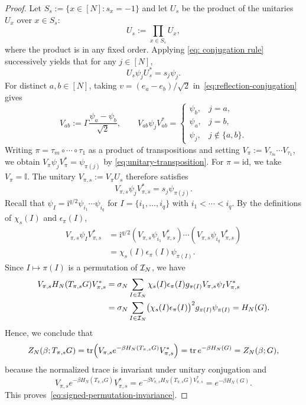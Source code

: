 \documentclass[../CLT_SYK.tex]{subfiles}
\begin{document}
\begin{proof}
Let $S_s:=\{x\in[N]:s_x=-1\}$ and let $U_s$ be the product of the unitaries
$U_x$ over $x\in S_s$:
$$U_s:= \prod_{x\in S_s} U_x,$$
where the product is in any fixed order.  Applying \eqref{eq: conjugation rule} successively yields that for any $j\in[N],$
\[
  U_s\psi_jU_s^*=s_j\psi_j.
\]
{For distinct $a,b\in[N]$, taking
$v=(e_a-e_b)/\sqrt2$ in~\eqref{eq:reflection-conjugation} gives
\begin{equation}\label{eq:unitary-transposition}
 V_{ab}:=\Gamma\frac{\psi_a-\psi_b}{\sqrt2},
\qquad
V_{ab}\psi_jV_{ab}^*
=\begin{cases}
	\psi_b,&j=a,\\
	\psi_a,&j=b,\\
	\psi_j,&j\notin\{a,b\}.
\end{cases}
\end{equation}
Writing $\pi=\tau_m\circ\cdots\circ\tau_1$ as a product of
transpositions and setting $V_\pi:=V_{\tau_m}\cdots V_{\tau_1}$,
we obtain $V_\pi\psi_jV_\pi^*=\psi_{\pi(j)}$ by \eqref{eq:unitary-transposition}.
For $\pi=\mathrm{id}$, we take $V_\pi=\mathbb I$.
The unitary $V_{\pi,s}:=V_\pi U_s$ therefore satisfies
\[
  V_{\pi,s}\psi_jV_{\pi,s}^*=s_j\psi_{\pi(j)}.
\]
Recall that $\psi_I=\mathrm i^{q/2}\psi_{i_1}\cdots\psi_{i_q}$
for $I=\{i_1,\ldots,i_q\}$ with $i_1<\cdots<i_q$.
By the definitions of $\chi_s(I)$ and $\epsilon_\pi(I)$,
\begin{align*}
  V_{\pi,s}\psi_IV_{\pi,s}^*
  &=\mathrm i^{q/2}
    (V_{\pi,s}\psi_{i_1}V_{\pi,s}^*)\cdots
    (V_{\pi,s}\psi_{i_q}V_{\pi,s}^*)\\
  &=\chi_s(I)\epsilon_\pi(I)\psi_{\pi(I)}.
\end{align*}
Since $I\mapsto\pi(I)$ is a permutation of $\mathcal I_N$, we have
\begin{align*}
  V_{\pi,s}H_N(T_{\pi,s}G)V_{\pi,s}^*
  &=\sigma_N\sum_{I\in\mathcal I_N}
    \chi_s(I)\epsilon_\pi(I)g_{\pi(I)}
    V_{\pi,s}\psi_IV_{\pi,s}^*\\
  &=\sigma_N\sum_{I\in\mathcal I_N}
    \bigl(\chi_s(I)\epsilon_\pi(I)\bigr)^2
    g_{\pi(I)}\psi_{\pi(I)}
    =H_N(G).
\end{align*}
Hence, we conclude that
\[
Z_N(\beta;T_{\pi,s}G)
=\operatorname{tr}\!\left(
V_{\pi,s}e^{-\beta H_N(T_{\pi,s}G)}V_{\pi,s}^*
\right)
=\operatorname{tr} e^{-\beta H_N(G)}
=Z_N(\beta;G),
\]
because the normalized trace is invariant under unitary conjugation
and
\[
V_{\pi,s}e^{-\beta H_N(T_{\pi,s}G)}V_{\pi,s}^*
=e^{-\beta V_{\pi,s}H_N(T_{\pi,s}G)V_{\pi,s}^*}
=e^{-\beta H_N(G)}.
\]
This proves~\eqref{eq:signed-permutation-invariance}.}




\end{proof}
\end{document}
